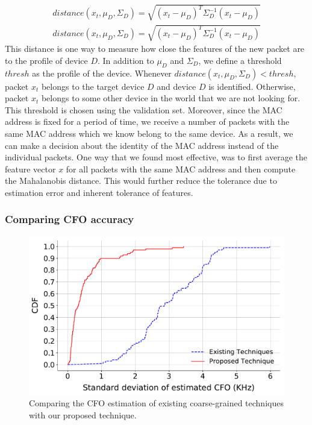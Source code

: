 \begin{gather*}
    distance(x_t,\mu_D,\Sigma_D) = \sqrt{(x_t-\mu_D)^T\Sigma_D^{-1}(x_t-\mu_D)}
\end{gather*}
\begin{gather*}
    distance(x_t,\mu_D,\Sigma_D) = \sqrt{(x_t-\mu_D)^T\Sigma_D^{-1}(x_t-\mu_D)}
\end{gather*}
This distance is one way to measure how close the features of the new packet are to the profile of device $D$. In addition to $\mu_D$ and $\Sigma_D$, we define a threshold $thresh$ as the profile of the device. Whenever $distance(x_t,\mu_D,\Sigma_D)<thresh$, packet $x_t$ belongs to the target device $D$ and device $D$ is identified. Otherwise, packet $x_t$ belongs to some other device in the world that we are not looking for. This threshold is chosen using the validation set.
Moreover, since the MAC address is fixed for a period of time, we receive a number of packets with the same MAC address which we know belong to the same device. As a result, we can make a decision about the identity of the MAC address instead of the individual packets. One way that we found most effective, was to first average the feature vector $x$ for all packets with the same MAC address and then compute the Mahalanobis distance. This would further reduce the tolerance due to estimation error and inherent tolerance of features.


\fi

\subsubsection{Comparing CFO accuracy} %
\begin{figure}[t!]
    \centering
    \includegraphics[width = \linewidth]{plots/CFO_comparison_ESP.pdf} 
    \caption{Comparing the CFO estimation of existing coarse-grained techniques with our proposed technique.}
    \label{fig:cfo_comp}
\end{figure}


